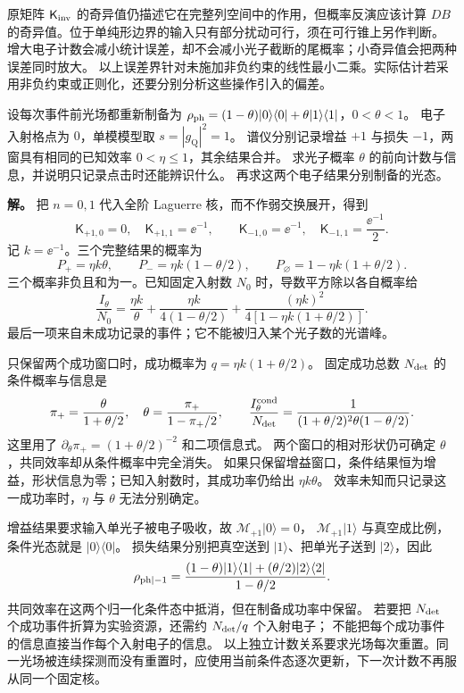 原矩阵 $\mathsf K_{\rm inv}$ 的奇异值仍描述它在完整列空间中的作用，但概率反演应该计算
$DB$ 的奇异值。位于单纯形边界的输入只有部分扰动可行，须在可行锥上另作判断。
增大电子计数会减小统计误差，却不会减小光子截断的尾概率；小奇异值会把两种误差同时放大。
以上误差界针对未施加非负约束的线性最小二乘。实际估计若采用非负约束或正则化，还要分别分析这些操作引入的偏差。

\begin{exbox}
设每次事件前光场都重新制备为
$\rho_{\rm ph}=(1-\theta)|0\rangle\langle0|+\theta|1\rangle\langle1|$，$0<\theta<1$。
电子入射格点为 $0$，单模模型取 $s=|g_{\mathrm Q}|^2=1$。
谱仪分别记录增益 $+1$ 与损失 $-1$，两窗具有相同的已知效率 $0<\eta\le1$，其余结果合并。
求光子概率 $\theta$ 的前向计数与信息，并说明只记录点击时还能辨识什么。
再求这两个电子结果分别制备的光态。

\textbf{解。}
把 $n=0,1$ 代入全阶 Laguerre 核，而不作弱交换展开，得到
\[
 \mathsf K_{+1,0}=0,\quad \mathsf K_{+1,1}=\ee^{-1},\qquad
 \mathsf K_{-1,0}=\ee^{-1},\quad \mathsf K_{-1,1}=\frac{\ee^{-1}}2.
\]
记 $k=\ee^{-1}$。三个完整结果的概率为
\begin{equation}
 P_+=\eta k\theta,\qquad P_-=\eta k(1-\theta/2),\qquad
 P_\varnothing=1-\eta k(1+\theta/2).
 \label{eq:feqo-one-photon-count-model}
\end{equation}
三个概率非负且和为一。已知固定入射数 $N_0$ 时，导数平方除以各自概率给
\[
 \frac{I_\theta}{N_0}
 =\frac{\eta k}{\theta}
 +\frac{\eta k}{4(1-\theta/2)}
 +\frac{(\eta k)^2}{4[1-\eta k(1+\theta/2)]}.
\]
最后一项来自未成功记录的事件；它不能被归入某个光子数的光谱峰。

只保留两个成功窗口时，成功概率为 $q=\eta k(1+\theta/2)$。
固定成功总数 $N_{\rm det}$ 的条件概率与信息是
\begin{equation}
 \pi_+=\frac{\theta}{1+\theta/2},\quad
 \theta=\frac{\pi_+}{1-\pi_+/2},\qquad
 \frac{I_\theta^{\rm cond}}{N_{\rm det}}
 =\frac1{(1+\theta/2)^2\theta(1-\theta/2)}.
 \label{eq:feqo-one-photon-selected-information}
\end{equation}
这里用了 $\partial_\theta\pi_+=(1+\theta/2)^{-2}$ 和二项信息式。
两个窗口的相对形状仍可确定 $\theta$，共同效率却从条件概率中完全消失。
如果只保留增益窗口，条件结果恒为增益，形状信息为零；已知入射数时，其成功率仍给出 $\eta k\theta$。
效率未知而只记录这一成功率时，$\eta$ 与 $\theta$ 无法分别确定。

增益结果要求输入单光子被电子吸收，故 $\mathscr M_{+1}|0\rangle=0$，
$\mathscr M_{+1}|1\rangle$ 与真空成比例，条件光态就是 $|0\rangle\langle0|$。
损失结果分别把真空送到 $|1\rangle$、把单光子送到 $|2\rangle$，因此
\begin{equation}
 \rho_{{\rm ph}|-1}
 =\frac{(1-\theta)|1\rangle\langle1|+(\theta/2)|2\rangle\langle2|}{1-\theta/2}.
 \label{eq:feqo-one-photon-selected-state}
\end{equation}
共同效率在这两个归一化条件态中抵消，但在制备成功率中保留。
若要把 $N_{\rm det}$ 个成功事件折算为实验资源，还需约 $N_{\rm det}/q$ 个入射电子；
不能把每个成功事件的信息直接当作每个入射电子的信息。
以上独立计数关系要求光场每次重置。同一光场被连续探测而没有重置时，应使用当前条件态逐次更新，下一次计数不再服从同一个固定核。
\end{exbox}
